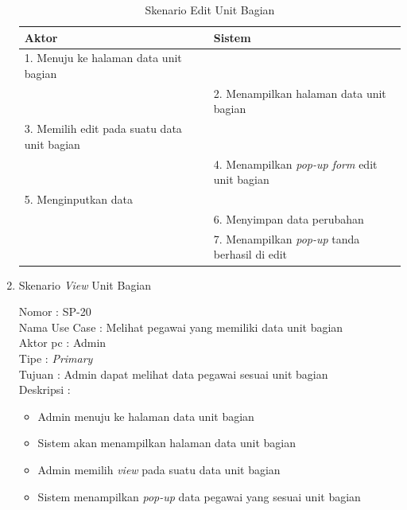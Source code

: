 \begin{enumerate}
\begin{itemize}
\end{itemize}

\begin{table}
	\caption{Skenario Edit Unit Bagian}
	\centering
	\begin{tabular}{ | p{55mm} | p{73mm} |}
		\hline 
		\textbf{Aktor} & \textbf{Sistem} \\
		\hline
		
		1.	Menuju ke halaman data unit bagian &  \\
		
		\hline
		
		&  2. Menampilkan halaman data unit bagian \\
		
		\hline
		
		3. Memilih edit pada suatu data unit bagian & \\
		
		\hline
		
		& 4.	Menampilkan \textit{pop-up form} edit unit bagian \\
		
		\hline
		
		5.	Menginputkan data  & \\
		\hline
		
		& 6.	Menyimpan data perubahan \\
		\hline
		
		& 7.	Menampilkan \textit{pop-up} tanda berhasil di edit \\
		\hline
		
	\end{tabular}
\end{table}

\item Skenario \textit{View} Unit Bagian

Nomor \kern 3.6pc : SP-20 \\
Nama Use Case : Melihat pegawai yang memiliki data unit bagian \\
Aktor  pc : Admin \\
Tipe \kern 4.6pc : \textit{Primary} \\
Tujuan \kern 3.6pc : Admin dapat melihat data pegawai sesuai unit bagian \\
Deskripsi \kern 2.5pc : 

\begin{itemize}
	\item Admin menuju ke halaman data unit bagian
	\item Sistem akan menampilkan halaman data unit bagian
	\item Admin memilih \textit{view} pada suatu data unit bagian
	\item Sistem menampilkan \textit{pop-up} data pegawai yang sesuai unit bagian
	

\end{itemize}
\end{enumerate}
